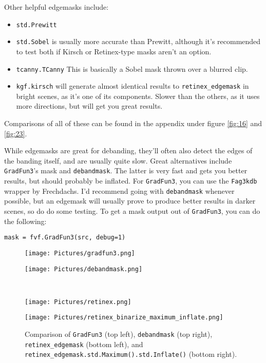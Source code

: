 \documentclass{scrartcl}
\begin{document}
Other helpful edgemasks include:
\begin{itemize}
\item \texttt{std.Prewitt}
\item \texttt{std.Sobel} is usually more accurate than Prewitt, although it's recommended to test both if Kirsch or Retinex-type masks aren't an option.
\item \texttt{tcanny.TCanny} This is basically a Sobel mask thrown over a blurred clip.
\item \texttt{kgf.kirsch} will generate almost identical results to \texttt{retinex\_edgemask} in bright scenes, as it's one of its components.  Slower than the others, as it uses more directions, but will get you great results.
\end{itemize}

Comparisons of all of these can be found in the appendix under figure \ref{fig:16} and \ref{fig:23}.

While edgemasks are great for debanding, they'll often also detect the edges of the banding itself, and are usually quite slow.  Great alternatives include \texttt{GradFun3}'s mask and \texttt{debandmask}. The latter is very fast and gets you better results, but should probably be inflated. For \texttt{GradFun3}, you can use the \texttt{Fag3kdb} wrapper by Frechdachs.  I'd recommend going with \texttt{debandmask} whenever possible, but an edgemask will usually prove to produce better results in darker scenes, so do do some testing.  To get a mask output out of \texttt{GradFun3}, you can do the following:
\begin{lstlisting}
mask = fvf.GradFun3(src, debug=1)
\end{lstlisting}

\begin{figure}[h]
\begin{minipage}{.5\textwidth}
\centering
\texttt{[image: Pictures/gradfun3.png]}
\end{minipage}
\begin{minipage}{.5\textwidth}
\centering
\texttt{[image: Pictures/debandmask.png]}
\end{minipage}
\\
\begin{minipage}{.5\textwidth}
\centering
\texttt{[image: Pictures/retinex.png]}
\end{minipage}
\begin{minipage}{.5\textwidth}
\centering
\texttt{[image: Pictures/retinex\_binarize\_maximum\_inflate.png]}
\end{minipage}
\caption{Comparison of \texttt{GradFun3} (top left), \texttt{debandmask} (top right), \texttt{retinex\_edgemask} (bottom left), and \texttt{retinex\_edgemask.std.Maximum().std.Inflate()} (bottom right).}\label{fig:10}
\end{figure}
\end{document}
